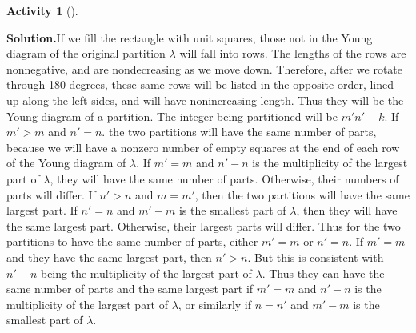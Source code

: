 \documentclass[10pt,]{book}
\theoremstyle{plain}
\theoremstyle{definition}
\newtheorem{activity}[project]{Activity}
\numberwithin{equation}{chapter}
\begin{document}
\begin{activity}[]
\begin{enumerate}[label=(\alph*)]
\textbf{Solution.}\quad If we fill the rectangle with unit squares, those not in the Young diagram of the original partition \(\lambda\) will fall into rows. The lengths of the rows are nonnegative, and are nondecreasing as we move down. Therefore, after we rotate through 180 degrees, these same rows will be listed in the opposite order, lined up along the left sides, and will have nonincreasing length. Thus they will be the Young diagram of a partition. The integer being partitioned will be \(m'n'-k\). If \(m'>m\) and \(n'=n\). the two partitions will have the same number of parts, because we will have a nonzero number of empty squares at the end of each row of the Young diagram of \(\lambda\). If \(m'=m\) and \(n'-n\) is the multiplicity of the largest part of \(\lambda\), they will have the same number of parts. Otherwise, their numbers of parts will differ. If \(n'>n\) and \(m=m'\), then the two partitions will have the same largest part. If \(n'=n\) and \(m'-m\) is the smallest part of \(\lambda\), then they will have the same largest part. Otherwise, their largest parts will differ. Thus for the two partitions to have the same number of parts, either \(m'=m\) or \(n'=n\). If \(m'=m\) and they have the same largest part, then \(n'>n\). But this is consistent with \(n'-n\) being the multiplicity of the largest part of \(\lambda\). Thus they can have the same number of parts and the same largest part if \(m'=m\) and \(n'-n\) is the multiplicity of the largest part of \(\lambda\), or similarly if \(n=n'\) and \(m'-m\) is the smallest part of \(\lambda\).%

\end{enumerate}
\end{activity}
\end{document}
